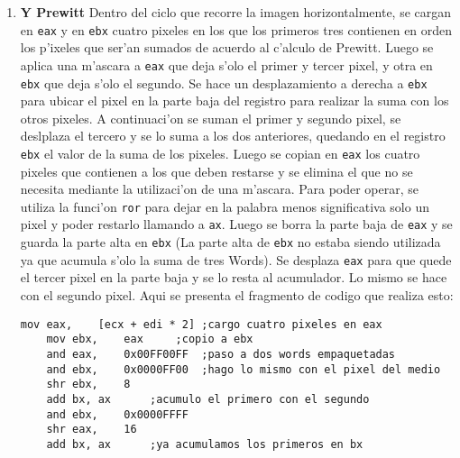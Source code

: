 \documentclass[11pt]{article}
\begin{document}
\begin{enumerate}
\begin{enumerate}
\begin{lstlisting}[frame=single]
\end{lstlisting}
\item \textbf{Y Prewitt}
\subitem Dentro del ciclo que recorre la imagen horizontalmente, se cargan en \verb'eax' y en \verb'ebx' cuatro pixeles en los que los primeros tres contienen en orden los p'ixeles que ser'an sumados de acuerdo al c'alculo de Prewitt.
Luego se aplica una m'ascara a \verb'eax' que deja s'olo el primer y tercer pixel, y otra en \verb'ebx' que deja s'olo el segundo. Se hace un desplazamiento a derecha a \verb'ebx' para ubicar el pixel en la parte baja del registro para realizar la suma con los otros pixeles. A continuaci'on se suman el primer y segundo pixel, se deslplaza el tercero y se lo suma a los dos anteriores, quedando en el registro \verb'ebx' el valor de la suma de los pixeles.
Luego se copian en \verb'eax' los cuatro pixeles que contienen a los que deben restarse y se elimina el que no se necesita mediante la utilizaci'on de una m'ascara. Para poder operar, se utiliza la funci'on \verb'ror' para dejar en la palabra menos significativa solo un pixel y poder restarlo llamando a \verb'ax'. Luego se borra la parte baja de \verb'eax' y se guarda la parte alta en \verb'ebx' (La parte alta de \verb'ebx' no estaba siendo utilizada ya que acumula s'olo la suma de tres Words). Se desplaza \verb'eax' para que quede el tercer pixel en la parte baja y se lo resta al acumulador. Lo mismo se hace con el segundo pixel. Aqui se presenta el fragmento de codigo que realiza esto:
\begin{lstlisting}[frame=single]
	mov	eax,	[ecx + edi * 2]	;cargo cuatro pixeles en eax
	mov	ebx,	eax		;copio a ebx
	and	eax,	0x00FF00FF	;paso a dos words empaquetadas
	and	ebx,	0x0000FF00	;hago lo mismo con el pixel del medio
	shr	ebx,	8
	add	bx,	ax		;acumulo el primero con el segundo
	and	ebx,	0x0000FFFF
	shr	eax,	16
	add	bx,	ax		;ya acumulamos los primeros en bx
	

\end{lstlisting}
\end{enumerate}
\end{enumerate}
\end{document}
